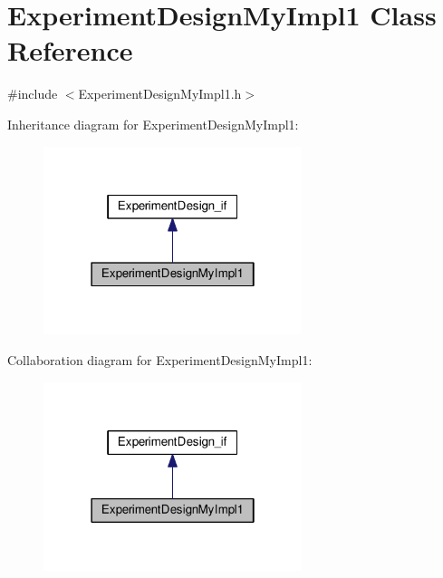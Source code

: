 \hypertarget{class_experiment_design_my_impl1}{\section{Experiment\-Design\-My\-Impl1 Class Reference}
\label{class_experiment_design_my_impl1}
}


{\ttfamily \#include $<$Experiment\-Design\-My\-Impl1.\-h$>$}



Inheritance diagram for Experiment\-Design\-My\-Impl1\-:
\nopagebreak
\begin{figure}[H]
\begin{center}
\leavevmode
\includegraphics[width=214pt]{class_experiment_design_my_impl1__inherit__graph}
\end{center}
\end{figure}


Collaboration diagram for Experiment\-Design\-My\-Impl1\-:
\nopagebreak
\begin{figure}[H]
\begin{center}
\leavevmode
\includegraphics[width=214pt]{class_experiment_design_my_impl1__coll__graph}
\end{center}
\end{figure}
